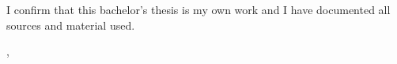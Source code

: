 \thispagestyle{empty}
\vspace*{0.8\textheight}
\noindent
I confirm that this bachelor's thesis is my own work and I have documented all sources and material used.

\vspace{15mm}
\noindent
\getSubmissionLocation{}, \getSubmissionDate{} \hspace{50mm} \getAuthor{}

\cleardoublepage{}
